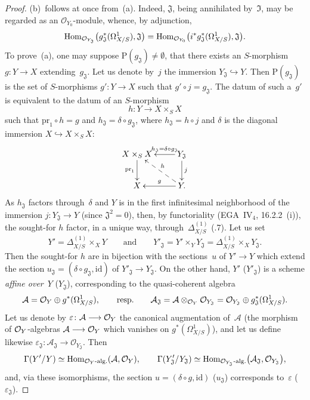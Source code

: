 \begin{proof}
(b)~follows at once from~(a). Indeed, \(\mathfrak{J}\), being annihilated
by~\(\mathfrak{I}\), may be regarded as an \(\mathcal{O}_{Y_0}\)-module,
whence, by adjunction,
\[
\operatorname{Hom}_{\mathcal{O}_{Y_{\mathfrak{J}}}}
\bigl(g_{\mathfrak{J}}^{*}(\Omega^1_{X/S}),\mathfrak{J}\bigr)
=\operatorname{Hom}_{\mathcal{O}_{Y_0}}
\bigl(i^{*}g_{\mathfrak{J}}^{*}(\Omega^1_{X/S}),\mathfrak{J}\bigr).
\]
To prove~(a), one may suppose \(\mathrm{P}(g_{\mathfrak{J}})\neq\emptyset\),
\ie that there exists an \(S\)-morphism \(g\colon Y\to X\)
extending~\(g_{\mathfrak{J}}\). Let us denote by~\(j\) the immersion
\(Y_{\mathfrak{J}}\hookrightarrow Y\). Then \(\mathrm{P}(g_{\mathfrak{J}})\)
is the set of \(S\)-morphisms \(g'\colon Y\to X\) such that
\(g'\circ j=g_{\mathfrak{J}}\). The datum of such a~\(g'\) is equivalent
to the datum of an \(S\)-morphism
\[
h\colon Y\longrightarrow X\times_S X
\]
such that \(\mathrm{pr}_1\circ h=g\) and
\(h_{\mathfrak{J}}=\delta\circ g_{\mathfrak{J}}\), where
\(h_{\mathfrak{J}}=h\circ j\) and \(\delta\) is the diagonal immersion
\(X\hookrightarrow X\times_S X\):
\[
\xymatrix{
X\times_S X \ar[d]_{\mathrm{pr}_1}
  & Y_{\mathfrak{J}}
    \ar[l]_-{h_{\mathfrak{J}}=\delta\circ g_{\mathfrak{J}}}
    \ar[d]^{j} \\
X
  & Y \ar[l]_{g} \ar@{-->}[ul]_{h}.
}
\]
As \(h_{\mathfrak{J}}\) factors through~\(\delta\) and \(Y\) is in the first
infinitesimal neighborhood of the immersion
\(j\colon Y_{\mathfrak{J}}\to Y\) (since \(\mathfrak{J}^{2}=0\)), then, by
functoriality (\cf EGA~\(\mathrm{IV}_{4}\), 16.2.2~(i)), the sought-for
\(h\) factor, in a unique way, through~\(\Delta^{(1)}_{X/S}\)
(.7). Let us set
\[
Y'=\Delta^{(1)}_{X/S}\times_X Y
\qquad\text{and}\qquad
Y'_{\mathfrak{J}}
=Y'\times_Y Y_{\mathfrak{J}}
=\Delta^{(1)}_{X/S}\times_X Y_{\mathfrak{J}}.
\]
Then the sought-for \(h\) are in bijection with the sections~\(u\) of
\(Y'\to Y\) which extend the section
\(u_{\mathfrak{J}}=(\delta\circ g_{\mathfrak{J}},\mathrm{id})\) of
\(Y'_{\mathfrak{J}}\to Y_{\mathfrak{J}}\). On the other hand, \(Y'\)
(\resp \(Y'_{\mathfrak{J}}\)) is a scheme \emph{affine over}~\(Y\)
(\resp \(Y_{\mathfrak{J}}\)), corresponding to the quasi-coherent algebra
\[
\mathcal{A}=\mathcal{O}_Y\oplus g^{*}(\Omega^1_{X/S}),
\qquad\text{resp.}\qquad
\mathcal{A}_{\mathfrak{J}}
=\mathcal{A}\otimes_{\mathcal{O}_Y}\mathcal{O}_{Y_{\mathfrak{J}}}
=\mathcal{O}_{Y_{\mathfrak{J}}}\oplus
g_{\mathfrak{J}}^{*}(\Omega^1_{X/S}).
\]
Let us denote by \(\varepsilon\colon\mathcal{A}\longrightarrow\mathcal{O}_Y\) the canonical
augmentation of~\(\mathcal{A}\) (\ie the morphism of \(\mathcal{O}_Y\)-algebras
\(\mathcal{A}\longrightarrow\mathcal{O}_Y\) which vanishes on \(g^{*}(\Omega^1_{X/S})\)), and let
us define likewise
\(\varepsilon_{\mathfrak{J}}\colon\mathcal{A}_{\mathfrak{J}}
\to\mathcal{O}_{Y_{\mathfrak{J}}}\). Then
\[
\Gamma(Y'/Y)\simeq\operatorname{Hom}_{\mathcal{O}_Y\text{-alg.}}(\mathcal{A},\mathcal{O}_Y),
\qquad
\Gamma(Y'_{\mathfrak{J}}/Y_{\mathfrak{J}})
\simeq\operatorname{Hom}_{\mathcal{O}_{Y_{\mathfrak{J}}}\text{-alg.}}
\bigl(\mathcal{A}_{\mathfrak{J}},\mathcal{O}_{Y_{\mathfrak{J}}}\bigr),
\]
and, via these isomorphisms, the section
\(u=(\delta\circ g,\mathrm{id})\) (\resp \(u_{\mathfrak{J}}\)) corresponds
to~\(\varepsilon\) (\resp \(\varepsilon_{\mathfrak{J}}\)).
\renewcommand{\qedsymbol}{}
\end{proof}
